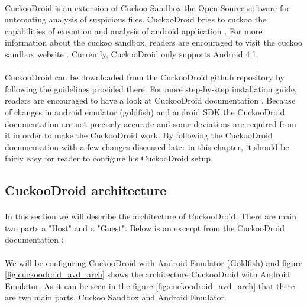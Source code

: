 \documentclass[../main.tex]{subfile}
\begin{document}
		
		\paragraph{} CuckooDroid is an extension of Cuckoo Sandbox the Open Source software for automating analysis of suspicious files. CuckooDroid brigs to cuckoo the capabilities of execution and analysis of android application \cite{cuckoodroid_docs}. For more information about the cuckoo sandbox, readers are encouraged to visit the cuckoo sandbox website \cite{cuckoo_website}. Currently, CuckooDroid only supports Android 4.1.
		
		\paragraph{} CuckooDroid can be downloaded from the CuckooDroid github repository \cite{cuckoodroid_github} by following the guidelines provided there. For more step-by-step installation guide, readers are encouraged to have a look at CuckooDroid documentation \cite{cuckoodroid_docs}. Because of changes in android emulator (goldfish) and android SDK the CuckooDroid documentation are not precisely accurate and some deviations are required from it in order to make the CuckooDroid work. By following the CuckooDroid documentation with a few changes discussed later in this chapter, it should be fairly easy for reader to configure his CuckooDroid setup. 

		
		\subsection{CuckooDroid architecture}
		\paragraph{} In this section we will describe the architecture of CuckooDroid. There are main two parts a "Host" and a "Guest". Below is an excerpt from the CuckooDroid documentation \cite{cuckoodroid_docs}:
		
		
		\paragraph{} We will be configuring CuckooDroid with Android Emulator (Goldfish) and figure \ref{fig:cuckoodroid_avd_arch} shows the architecture CuckooDroid with Android Emulator. As it can be seen in the figure \ref{fig:cuckoodroid_avd_arch} that there are two main parts, Cuckoo Sandbox and Android Emulator.
		
\end{document}
